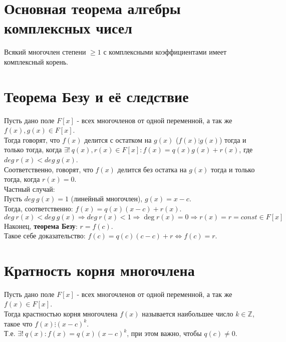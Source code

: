 \documentclass[a4paper,11pt]{report}
\begin{document}
\section{Основная теорема алгебры комплексных чисел}
Всякий многочлен степени $\geqslant 1$ с комплексными коэффициентами имеет комплексный корень.
\section{Теорема Безу и её следствие}
Пусть дано поле $F[x]$ - всех многочленов от одной переменной, а так же $f(x), g(x) \in F[x]$.\\
Тогда говорят, что $f(x)$ делится с остатком на $g(x)$ ($f(x)\vdots{g(x)}$) тогда и только тогда, когда 
$\exists !\ q(x), r(x) \in F[x] : f(x) = q(x)g(x) + r(x)$, где $deg\ r(x) < deg\ g(x)$.\\
Соответственно, говорят, что $f(x)$ делится без остатка на $g(x)$ тогда и только тогда, когда $r(x) = 0$.\\
Частный случай:\\
Пусть $deg\ g(x) = 1$ (линейный многочлен), $g(x) = x - c$.\\
Тогда, соответственно: $f(x) = q(x)(x - c) + r(x)$.\\
$deg\ r(x) < deg\ g(x) \Rightarrow deg\ r(x) < 1 \Rightarrow \deg r(x) = 0 \Rightarrow r(x) = r = const \in F[x]$\\
Наконец, \textbf{теорема Безу}: $r = f(c)$.\\
Такое себе доказательство: $f(c) = q(c)(c - c) + r \Leftrightarrow f(c) = r$.\\
\section{Кратность корня многочлена}
Пусть дано поле $F[x]$ - всех многочленов от одной переменной, а так же $f(x) \in F[x]$.\\
Тогда крастностью корня многочлена $f(x)$ называется наибольшее число $k \in \mathbb{Z}$, такое что
$f(x)\vdots{(x - c)^k}$.\\
Т.е. $\exists ! \ q(x): f(x) = q(x)(x - c)^k$, при этом важно, чтобы $q(c) \neq 0$.\\
\end{document}
